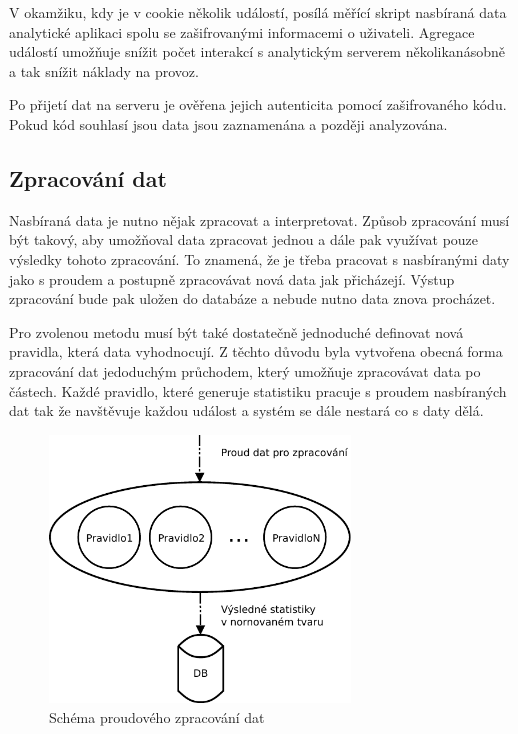 \documentclass[bc,male,java,dept456]{diploma}						%
\begin{document}
V okamžiku, kdy je v cookie několik událostí, posílá měřící skript nasbíraná data analytické aplikaci spolu se zašifrovanými informacemi o uživateli. Agregace událostí umožňuje snížit počet interakcí s analytickým serverem několikanásobně a tak snížit náklady na provoz.

Po přijetí dat na serveru je ověřena jejich autenticita pomocí zašifrovaného kódu. Pokud kód souhlasí jsou data jsou zaznamenána a později analyzována.







\subsection{Zpracování dat}

Nasbíraná data je nutno nějak zpracovat a interpretovat. Způsob zpracování musí být takový, aby umožňoval data zpracovat jednou a dále pak využívat pouze výsledky tohoto zpracování. To znamená, že je třeba pracovat s nasbíranými daty jako s proudem a postupně zpracovávat nová data jak přicházejí. Výstup zpracování bude pak uložen do databáze a nebude nutno data znova procházet.

Pro zvolenou metodu musí být také dostatečně jednoduché definovat nová pravidla, která data vyhodnocují. Z těchto důvodu byla vytvořena obecná forma zpracování dat jedoduchým průchodem, který umožňuje zpracovávat data po částech. Každé pravidlo, které generuje statistiku pracuje s proudem nasbíraných dat tak že navštěvuje každou událost a systém se dále nestará co s daty dělá.

\begin{figure}[h]
	\centering
	\includegraphics[width=8cm]{img/zpracovani_2.pdf}
	\caption{Schéma proudového zpracování dat}
	\label{img:measuring}
\end{figure}
\end{document}
